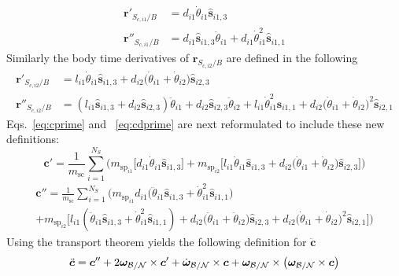 \documentclass[paper]{aiaaNew}
\begin{document}
	\begin{align}
	\bm{r}'_{S_{c,i1}/B} &= d_{i1} \dot{\theta}_{i1} \bm{\hat{s}}_{i1,3}
	\label{eq:drcgspi1}
\\
	\bm{r}''_{S_{c,i1}/B} &= d_{i1} \bm{\hat{s}}_{i1,3} \ddot{\theta}_{i1} + d_{i1} \dot{\theta}_{i1}^2 \bm{\hat{s}}_{i1,1}
	\label{eq:ddrcgspi1}
	\end{align}
	Similarly the body time derivatives of $\bm{r}_{S_{c,i2}/B}$ are defined in the following
	\begin{align}
	\bm{r}'_{S_{c,i2}/B} &= l_{i1} \dot{\theta}_{i1} \bm{\hat{s}}_{i1,3} + d_{i2}\big(\dot{\theta}_{i1} + \dot{\theta}_{i2}\big)\bm{\hat{s}}_{i2,3}
	\label{eq:drcgspi2}
\\
	\bm{r}''_{S_{c,i2}/B} &= (l_{i1} \bm{\hat{s}}_{i1,3} + d_{i2} \bm{\hat{s}}_{i2,3}) \ddot{\theta}_{i1} + d_{i2} \bm{\hat{s}}_{i2,3} \ddot{\theta}_{i2} + l_{i1} \dot{\theta}_{i1}^2 \bm{\hat{s}}_{i1,1} + d_{i2}\big(\dot{\theta}_{i1} + \dot{\theta}_{i2}\big)^2\bm{\hat{s}}_{i2,1}
	\label{eq:ddrcgspi2}
	\end{align}
	Eqs.~\eqref{eq:cprime} and ~\eqref{eq:cdprime} are next reformulated to include these new definitions:
	\begin{equation}
	\bm{c}' = \frac{1}{m_{\text{sc}}}\sum_{i=1}^{N_{S}}\bigg(m_{\text{sp}_{i1}}\Big[d_{i1} \dot{\theta}_{i1} \bm{\hat{s}}_{i1,3}\Big]+m_{\text{sp}_{i2}}\Big[l_{i1} \dot{\theta}_{i1} \bm{\hat{s}}_{i1,3} + d_{i2}\big(\dot{\theta}_{i1} + \dot{\theta}_{i2}\big)\bm{\hat{s}}_{i2,3}\Big]\bigg)
	\label{eq:cprime2}
	\end{equation}
	\begin{multline}
	\bm{c}'' = \frac{1}{m_{\text{sc}}}\sum_{i=1}^{N_{S}}\bigg(m_{\text{sp}_{i1}}d_{i1} \big(\ddot{\theta}_{i1} \bm{\hat{s}}_{i1,3} + \dot{\theta}_{i1}^2 \bm{\hat{s}}_{i1,1}\big)\\
	+m_{\text{sp}_{i2}}\Big[l_{i1} \left(\ddot{\theta}_{i1} \bm{\hat{s}}_{i1,3} + \dot{\theta}_{i1}^2 \bm{\hat{s}}_{i1,1}\right) + d_{i2}\big(\ddot{\theta}_{i1} + \ddot{\theta}_{i2}\big)\bm{\hat{s}}_{i2,3} + d_{i2}\big(\dot{\theta}_{i1} + \dot{\theta}_{i2}\big)^2\bm{\hat{s}}_{i2,1}\Big]\bigg)
	\label{eq:cdprime2}
	\end{multline}
	Using the transport theorem\cite{schaub} yields the following definition for $\ddot{\bm c}$
	\begin{equation}
	\ddot{\bm c} = \bm{c}'' + 2\bm\omega_{\cal B/N}\times\bm{c}'+\dot{\bm\omega}_{\cal B/N}\times\bm{c}+\bm\omega_{\cal B/N}\times\left(\bm\omega_{\cal B/N}\times\bm{c}\right)
	\label{eq:cddot}
	\end{equation}
\end{document}
